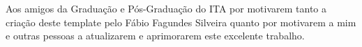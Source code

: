 \maketitle

\begin{itadedication}
Aos amigos da Graduação e Pós-Graduação do ITA por motivarem tanto a criação deste template pelo Fábio Fagundes Silveira quanto por motivarem a mim e outras pessoas a atualizarem e aprimorarem este excelente trabalho.
\end{itadedication}

\begin{itathanks}

\end{itathanks}

\thispagestyle{empty}
\ifhyperref{}\fi
\begin{flushright}
\begin{spacing}{1}
\mbox{}\vfill

\end{spacing}
\end{flushright}

\begin{abstract}
\noindent

\end{abstract}

\begin{englishabstract}
\noindent

\end{englishabstract}

\listoffigures %

\listoftables %

\printnoidxglossary[type=\acronymtype,
    title=\listofabbreviationsname,
    toctitle=\listofabbreviationsname,
    sort=standard,
    nonumberlist]
    
\printnoidxglossary[
    title=\listofsymbolsname,
    toctitle=\listofsymbolsname,
    sort=standard,
    nonumberlist]

\tableofcontents
